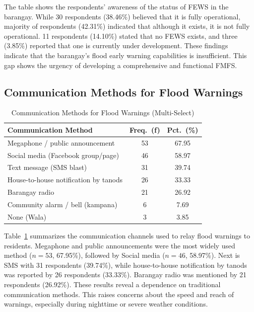 \documentclass{research}
\begin{document}
The table shows the respondents' awareness of the status of FEWS in the barangay. While 30 respondents (38.46\%)
believed that it is fully operational, majority of respondents
(42.31\%) indicated that although it exists, it is not fully operational. 11
respondents (14.10\%) stated that no FEWS exists, and three (3.85\%) reported that
one is currently under development. These findings indicate that the
barangay's flood early warning capabilities is insufficient. This gap shows the urgency of
developing a comprehensive and functional FMFS.
 
\subsection{Communication Methods for Flood Warnings}
 
\begin{table}[htbp]
\centering
\small
\caption{Communication Methods for Flood Warnings (Multi-Select)}
\label{tab:comms}
\begin{tabular}{p{9.5cm}|c|c}
\hline
\textbf{Communication Method} & \textbf{Freq.\ (f)} & \textbf{Pct.\ (\%)} \\
\hline
Megaphone / public announcement                 & 53 & 67.95 \\
Social media (Facebook group/page)              & 46 & 58.97 \\
Text message (SMS blast)                        & 31 & 39.74 \\
House-to-house notification by tanods           & 26 & 33.33 \\
Barangay radio                                  & 21 & 26.92 \\
Community alarm / bell (kampana)                &  6 &  7.69 \\
None (Wala)                                     &  3 &  3.85 \\
\hline
\end{tabular}
\end{table}
 
Table~\ref{tab:comms} summarizes the communication channels used to relay flood
warnings to residents. Megaphone and public announcements were the most widely
used method ($n=53$, 67.95\%), followed by Social media
($n=46$, 58.97\%). Next is SMS with 31 respondents (39.74\%), while
house-to-house notification by tanods was reported by 26 respondents (33.33\%).
Barangay radio was mentioned by 21 respondents (26.92\%). These results reveal a
dependence on traditional communication methods. This raises concerns
about the speed and reach of warnings, especially during nighttime or severe weather conditions.
 
\end{document}

